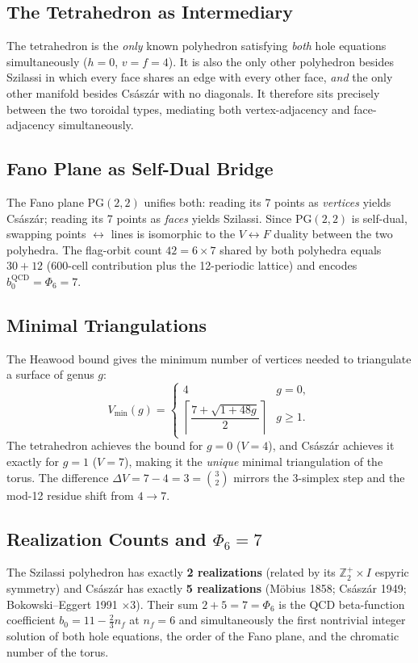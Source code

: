 \subsection{The Tetrahedron as Intermediary}

The tetrahedron is the \emph{only} known polyhedron satisfying
\emph{both} hole equations simultaneously ($h=0$, $v=f=4$).
It is also the only other polyhedron besides Szilassi in which every
face shares an edge with every other face, \emph{and} the only other
manifold besides Cs\'asz\'ar with no diagonals.
It therefore sits precisely between the two toroidal types, mediating
both vertex-adjacency and face-adjacency simultaneously.

\subsection{Fano Plane as Self-Dual Bridge}

The Fano plane $\mathrm{PG}(2,2)$ unifies both:
reading its 7 points as \emph{vertices} yields Cs\'asz\'ar;
reading its 7 points as \emph{faces} yields Szilassi.
Since $\mathrm{PG}(2,2)$ is self-dual, swapping points $\leftrightarrow$ lines
is isomorphic to the $V\leftrightarrow F$ duality between the two polyhedra.
The flag-orbit count $42 = 6\times 7$ shared by both polyhedra
equals $30 + 12$ (600-cell contribution plus the 12-periodic lattice)
and encodes $b_0^{\mathrm{QCD}} = \Phi_6 = 7$.

\subsection{Minimal Triangulations}

The Heawood bound gives the minimum number of vertices needed to
triangulate a surface of genus $g$:
\begin{equation}
  V_{\min}(g) =
  \begin{cases} 4 & g=0, \\
  \left\lceil\dfrac{7+\sqrt{1+48g}}{2}\right\rceil & g\geq 1.
  \end{cases}
  \label{eq:heawood}
\end{equation}
The tetrahedron achieves the bound for $g=0$ ($V=4$),
and Cs\'asz\'ar achieves it exactly for $g=1$ ($V=7$),
making it the \emph{unique} minimal triangulation of the torus.
The difference $\Delta V = 7-4 = 3 = \binom{3}{2}$ mirrors the
3-simplex step and the mod-12 residue shift from $4\to 7$.

\subsection{Realization Counts and $\Phi_6=7$}

The Szilassi polyhedron has exactly \textbf{2 realizations}
(related by its $\mathbb{Z}_2^+ \times I$ espyric symmetry)
and Cs\'asz\'ar has exactly \textbf{5 realizations}
(M\"obius 1858; Cs\'asz\'ar 1949; Bokowski--Eggert 1991 $\times 3$).
Their sum $2 + 5 = 7 = \Phi_6$ is the QCD beta-function coefficient
$b_0 = 11 - \tfrac{2}{3}n_f$ at $n_f = 6$ and simultaneously
the first nontrivial integer solution of both hole equations,
the order of the Fano plane, and the chromatic number of the torus.
